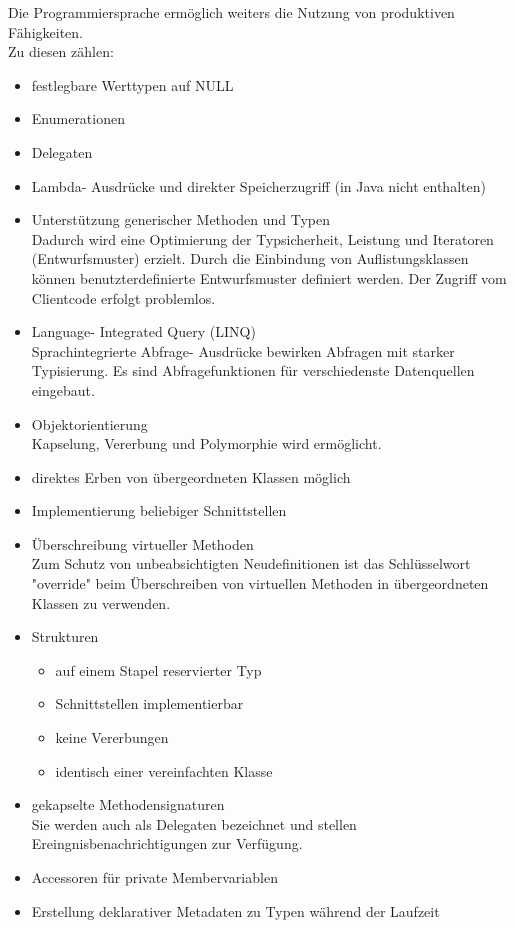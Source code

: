 \documentclass[12pt,a4paper]{report}
\begin{document}
\begin{onehalfspace}
Die Programmiersprache ermöglich weiters die Nutzung von produktiven Fähigkeiten.
\\Zu diesen zählen:
\begin{itemize}
\item festlegbare Werttypen auf NULL
\item Enumerationen
\item Delegaten
\item Lambda- Ausdrücke und direkter Speicherzugriff (in Java nicht enthalten)
\item Unterstützung generischer Methoden und Typen\\
Dadurch wird eine Optimierung der Typsicherheit, Leistung und Iteratoren (Entwurfsmuster) erzielt. Durch die Einbindung von Auflistungsklassen können benutzterdefinierte Entwurfsmuster definiert werden. Der Zugriff vom Clientcode erfolgt problemlos.
\item Language- Integrated Query (LINQ)\\
Sprachintegrierte Abfrage- Ausdrücke bewirken Abfragen mit starker Typisierung. Es sind Abfragefunktionen für verschiedenste Datenquellen eingebaut.
\item Objektorientierung\\
Kapselung, Vererbung und Polymorphie wird ermöglicht.
\item direktes Erben von übergeordneten Klassen möglich
\item Implementierung beliebiger Schnittstellen
\item Überschreibung virtueller Methoden\\
Zum Schutz von unbeabsichtigten Neudefinitionen ist das Schlüsselwort "{}override"{} beim Überschreiben von virtuellen Methoden in übergeordneten Klassen zu verwenden.
\item  Strukturen
\begin{itemize}
\item auf einem Stapel reservierter Typ
\item Schnittstellen implementierbar
\item keine Vererbungen
\item identisch einer vereinfachten Klasse
\end{itemize}
\item gekapselte Methodensignaturen\\
Sie werden auch als Delegaten bezeichnet und stellen Ereingnisbenachrichtigungen zur Verfügung.
\item Accessoren für private Membervariablen
\item Erstellung deklarativer Metadaten zu Typen während der Laufzeit

\end{itemize}
\end{onehalfspace}
\end{document}
